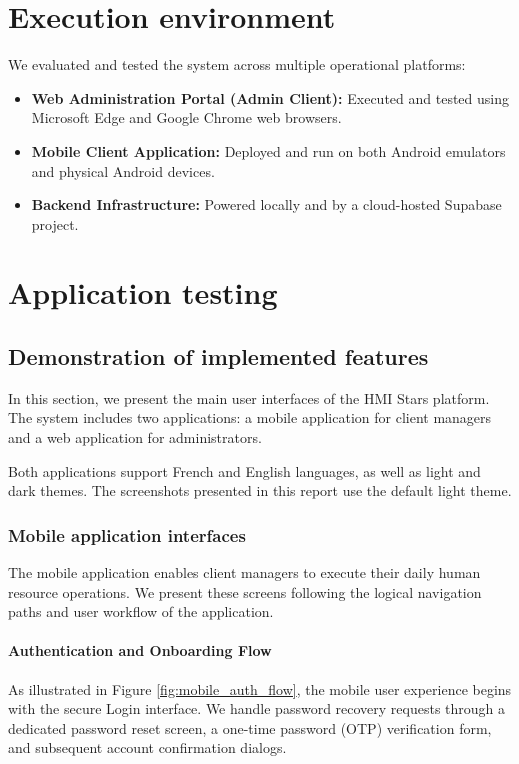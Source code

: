 \section{Execution environment}
We evaluated and tested the system across multiple operational platforms:
\begin{itemize}
    \item \textbf{Web Administration Portal (Admin Client):} Executed and tested using Microsoft Edge and Google Chrome web browsers.
    \item \textbf{Mobile Client Application:} Deployed and run on both Android emulators and physical Android devices.
    \item \textbf{Backend Infrastructure:} Powered locally and by a cloud-hosted Supabase project.
\end{itemize}

\section{Application testing}

\subsection{Demonstration of implemented features}
In this section, we present the main user interfaces of the HMI Stars platform. The system includes two applications: a mobile application for client managers and a web application for administrators.

Both applications support French and English languages, as well as light and dark themes. The screenshots presented in this report use the default light theme.


\subsubsection{Mobile application interfaces}
The mobile application enables client managers to execute their daily human resource operations. We present these screens following the logical navigation paths and user workflow of the application.

\paragraph{Authentication and Onboarding Flow} 

As illustrated in Figure \ref{fig:mobile_auth_flow}, the mobile user experience begins with the secure Login interface. We handle password recovery requests through a dedicated password reset screen, a one-time password (OTP) verification form, and subsequent account confirmation dialogs.

